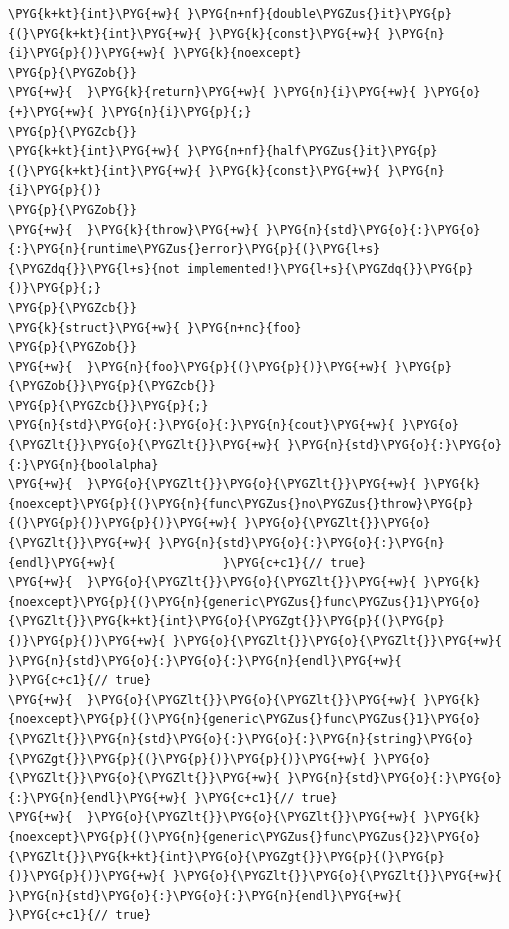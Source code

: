 \begin{codeblockbg}
\begin{Verbatim}[commandchars=\\\{\},breaklines=true,breakanywhere=true,fontsize=\codefont,xleftmargin=17bp]
\PYG{k+kt}{int}\PYG{+w}{ }\PYG{n+nf}{double\PYGZus{}it}\PYG{p}{(}\PYG{k+kt}{int}\PYG{+w}{ }\PYG{k}{const}\PYG{+w}{ }\PYG{n}{i}\PYG{p}{)}\PYG{+w}{ }\PYG{k}{noexcept}
\PYG{p}{\PYGZob{}}
\PYG{+w}{  }\PYG{k}{return}\PYG{+w}{ }\PYG{n}{i}\PYG{+w}{ }\PYG{o}{+}\PYG{+w}{ }\PYG{n}{i}\PYG{p}{;}
\PYG{p}{\PYGZcb{}}
\PYG{k+kt}{int}\PYG{+w}{ }\PYG{n+nf}{half\PYGZus{}it}\PYG{p}{(}\PYG{k+kt}{int}\PYG{+w}{ }\PYG{k}{const}\PYG{+w}{ }\PYG{n}{i}\PYG{p}{)}
\PYG{p}{\PYGZob{}}
\PYG{+w}{  }\PYG{k}{throw}\PYG{+w}{ }\PYG{n}{std}\PYG{o}{:}\PYG{o}{:}\PYG{n}{runtime\PYGZus{}error}\PYG{p}{(}\PYG{l+s}{\PYGZdq{}}\PYG{l+s}{not implemented!}\PYG{l+s}{\PYGZdq{}}\PYG{p}{)}\PYG{p}{;}
\PYG{p}{\PYGZcb{}}
\PYG{k}{struct}\PYG{+w}{ }\PYG{n+nc}{foo}
\PYG{p}{\PYGZob{}}
\PYG{+w}{  }\PYG{n}{foo}\PYG{p}{(}\PYG{p}{)}\PYG{+w}{ }\PYG{p}{\PYGZob{}}\PYG{p}{\PYGZcb{}}
\PYG{p}{\PYGZcb{}}\PYG{p}{;}
\PYG{n}{std}\PYG{o}{:}\PYG{o}{:}\PYG{n}{cout}\PYG{+w}{ }\PYG{o}{\PYGZlt{}}\PYG{o}{\PYGZlt{}}\PYG{+w}{ }\PYG{n}{std}\PYG{o}{:}\PYG{o}{:}\PYG{n}{boolalpha}
\PYG{+w}{  }\PYG{o}{\PYGZlt{}}\PYG{o}{\PYGZlt{}}\PYG{+w}{ }\PYG{k}{noexcept}\PYG{p}{(}\PYG{n}{func\PYGZus{}no\PYGZus{}throw}\PYG{p}{(}\PYG{p}{)}\PYG{p}{)}\PYG{+w}{ }\PYG{o}{\PYGZlt{}}\PYG{o}{\PYGZlt{}}\PYG{+w}{ }\PYG{n}{std}\PYG{o}{:}\PYG{o}{:}\PYG{n}{endl}\PYG{+w}{               }\PYG{c+c1}{// true}
\PYG{+w}{  }\PYG{o}{\PYGZlt{}}\PYG{o}{\PYGZlt{}}\PYG{+w}{ }\PYG{k}{noexcept}\PYG{p}{(}\PYG{n}{generic\PYGZus{}func\PYGZus{}1}\PYG{o}{\PYGZlt{}}\PYG{k+kt}{int}\PYG{o}{\PYGZgt{}}\PYG{p}{(}\PYG{p}{)}\PYG{p}{)}\PYG{+w}{ }\PYG{o}{\PYGZlt{}}\PYG{o}{\PYGZlt{}}\PYG{+w}{ }\PYG{n}{std}\PYG{o}{:}\PYG{o}{:}\PYG{n}{endl}\PYG{+w}{         }\PYG{c+c1}{// true}
\PYG{+w}{  }\PYG{o}{\PYGZlt{}}\PYG{o}{\PYGZlt{}}\PYG{+w}{ }\PYG{k}{noexcept}\PYG{p}{(}\PYG{n}{generic\PYGZus{}func\PYGZus{}1}\PYG{o}{\PYGZlt{}}\PYG{n}{std}\PYG{o}{:}\PYG{o}{:}\PYG{n}{string}\PYG{o}{\PYGZgt{}}\PYG{p}{(}\PYG{p}{)}\PYG{p}{)}\PYG{+w}{ }\PYG{o}{\PYGZlt{}}\PYG{o}{\PYGZlt{}}\PYG{+w}{ }\PYG{n}{std}\PYG{o}{:}\PYG{o}{:}\PYG{n}{endl}\PYG{+w}{ }\PYG{c+c1}{// true}
\PYG{+w}{  }\PYG{o}{\PYGZlt{}}\PYG{o}{\PYGZlt{}}\PYG{+w}{ }\PYG{k}{noexcept}\PYG{p}{(}\PYG{n}{generic\PYGZus{}func\PYGZus{}2}\PYG{o}{\PYGZlt{}}\PYG{k+kt}{int}\PYG{o}{\PYGZgt{}}\PYG{p}{(}\PYG{p}{)}\PYG{p}{)}\PYG{+w}{ }\PYG{o}{\PYGZlt{}}\PYG{o}{\PYGZlt{}}\PYG{+w}{ }\PYG{n}{std}\PYG{o}{:}\PYG{o}{:}\PYG{n}{endl}\PYG{+w}{         }\PYG{c+c1}{// true}

\end{Verbatim}
\end{codeblockbg}
